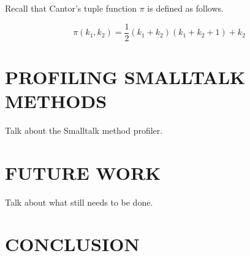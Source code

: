 \documentclass[english,paper=a4,twocolumn=true,DIV=calc,fontsize=9pt]{scrartcl}
\begin{document}
Recall that Cantor's tuple function $\pi$ is defined as follows.

$$\pi(k_1, k_2) = \frac{1}{2}(k_1+k_2)(k_1+k_2+1)+k_2$$

\section{PROFILING SMALLTALK METHODS}
Talk about the Smalltalk method profiler.

\section{FUTURE WORK}
Talk about what still needs to be done.

\section{CONCLUSION}

{}

\end{document}
